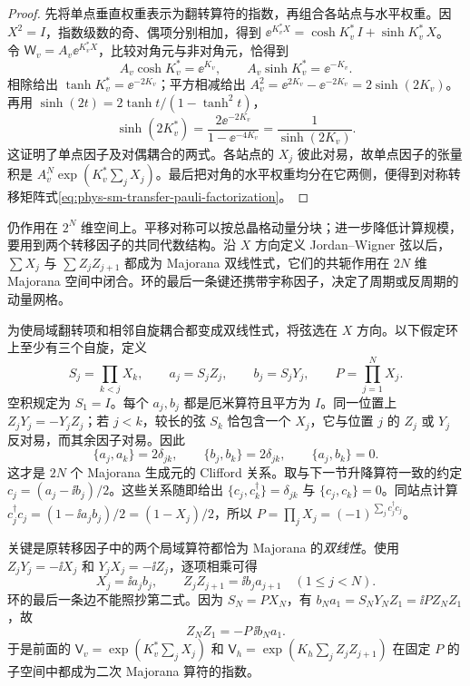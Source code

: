 \begin{proof}
先将单点垂直权重表示为翻转算符的指数，再组合各站点与水平权重。因 \(X^2=I\)，指数级数的奇、偶项分别相加，得到
\(\ee^{K_v^*X}=\cosh K_v^*\,I+\sinh K_v^*\,X\)。
令 \(\mathsf W_v=A_v\ee^{K_v^*X}\)，比较对角元与非对角元，恰得到
\[
A_v\cosh K_v^*=\ee^{K_v},\qquad
A_v\sinh K_v^*=\ee^{-K_v}.
\]
相除给出 \(\tanh K_v^*=\ee^{-2K_v}\)；平方相减给出
\(A_v^2=\ee^{2K_v}-\ee^{-2K_v}=2\sinh(2K_v)\)。
再用 \(\sinh(2t)=2\tanh t/(1-\tanh^2t)\)，
\[
\sinh(2K_v^*)
=\frac{2\ee^{-2K_v}}{1-\ee^{-4K_v}}
=\frac1{\sinh(2K_v)}.
\]
这证明了单点因子及对偶耦合的两式。各站点的 \(X_j\) 彼此对易，故单点因子的张量积是
\(A_v^N\exp(K_v^*\sum_jX_j)\)。最后把对角的水平权重均分在它两侧，便得到对称转移矩阵式\cref{eq:phys-sm-transfer-pauli-factorization}。
\end{proof}

仍作用在 \(2^N\) 维空间上。平移对称可以按总晶格动量分块；进一步降低计算规模，要用到两个转移因子的共同代数结构。沿 $X$ 方向定义 Jordan--Wigner 弦以后，\(\sum X_j\) 与 \(\sum Z_jZ_{j+1}\) 都成为 Majorana 双线性式，它们的共轭作用在 $2N$ 维 Majorana 空间中闭合。环的最后一条键还携带宇称因子，决定了周期或反周期的动量网格。

为使局域翻转项和相邻自旋耦合都变成双线性式，将弦选在 $X$ 方向。以下假定环上至少有三个自旋，定义
\[
S_j=\prod_{k<j}X_k,\qquad
a_j=S_jZ_j,\qquad b_j=S_jY_j,\qquad
P=\prod_{j=1}^N X_j .
\]
空积规定为 \(S_1=I\)。每个 \(a_j,b_j\) 都是厄米算符且平方为 \(I\)。同一位置上 \(Z_jY_j=-Y_jZ_j\)；若 \(j<k\)，较长的弦 \(S_k\) 恰包含一个 \(X_j\)，它与位置 \(j\) 的 \(Z_j\) 或 \(Y_j\) 反对易，而其余因子对易。因此
\begin{equation}
\{a_j,a_k\}=2\delta_{jk},\qquad
\{b_j,b_k\}=2\delta_{jk},\qquad
\{a_j,b_k\}=0 .
\label{eq:phys-sm-majorana-relations}
\end{equation}
这才是 \(2N\) 个 Majorana 生成元的 Clifford 关系。取与下一节升降算符一致的约定
\(c_j=(a_j-\ii b_j)/2\)。这些关系随即给出
\(\{c_j,c_k^\dagger\}=\delta_{jk}\) 与 \(\{c_j,c_k\}=0\)。同站点计算
\(c_j^\dagger c_j=(1-\ii a_jb_j)/2=(1-X_j)/2\)，所以
\(P=\prod_jX_j=(-1)^{\sum_jc_j^\dagger c_j}\)。

关键是原转移因子中的两个局域算符都恰为 Majorana 的\emph{双线性}。使用 \(Z_jY_j=-\ii X_j\) 和 \(Y_jX_j=-\ii Z_j\)，逐项相乘可得
\begin{equation}
X_j=\ii a_jb_j,\qquad
Z_jZ_{j+1}=\ii b_ja_{j+1}\quad(1\le j<N).
\label{eq:phys-sm-majorana-bulk}
\end{equation}
环的最后一条边不能照抄第二式。因为 \(S_N=P X_N\)，有
\(b_Na_1=S_NY_NZ_1=\ii PZ_NZ_1\)，故
\begin{equation}
Z_NZ_1=-P\,\ii b_Na_1.
\label{eq:phys-sm-majorana-boundary}
\end{equation}
于是前面的 \(\mathsf V_v=\exp(K_v^*\sum_jX_j)\) 和
\(\mathsf V_h=\exp(K_h\sum_jZ_jZ_{j+1})\)
在固定 \(P\) 的子空间中都成为二次 Majorana 算符的指数。

